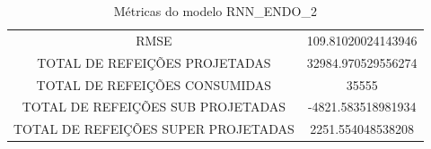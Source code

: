 \documentclass[	12pt, Times, openright, twoside, a4paper, english, brazil]{abntex2}
\begin{document}
                \begin{figure}[H]
                \end{figure}

                \begin{figure}[H]
                \end{figure}
                
                
                   \begin{table}[!ht]
                   \centering
                   \caption{Métricas do modelo RNN\_ENDO\_2 }
                    \begin{tabular}{|c|c|}
                    \rowcolor{gray!50}
                    \hline
                \multicolumn{2}{c}{METRICAS DO MODELO RNN\_ENDO\_2 :}  \\ \hline
                RMSE & 109.81020024143946\\
                TOTAL DE REFEIÇÕES PROJETADAS & 32984.970529556274\\
                TOTAL DE REFEIÇÕES CONSUMIDAS & 35555\\
                TOTAL DE REFEIÇÕES SUB PROJETADAS & -4821.583518981934\\
                TOTAL DE REFEIÇÕES SUPER PROJETADAS & 2251.554048538208\\
                \hline \end{tabular} \end{table}
\end{document}

